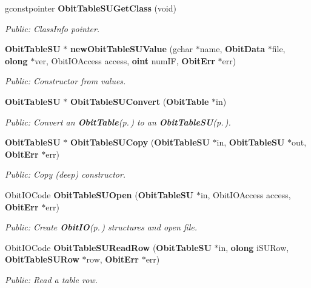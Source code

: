 \begin{CompactItemize}
gconstpointer {\bf Obit\-Table\-SUGet\-Class} (void)
\begin{CompactList}\small\item\em Public: Class\-Info pointer. \item\end{CompactList}\item 
{\bf Obit\-Table\-SU} $\ast$ {\bf new\-Obit\-Table\-SUValue} (gchar $\ast$name, {\bf Obit\-Data} $\ast$file, {\bf olong} $\ast$ver, Obit\-IOAccess access, {\bf oint} num\-IF, {\bf Obit\-Err} $\ast$err)
\begin{CompactList}\small\item\em Public: Constructor from values. \item\end{CompactList}\item 
{\bf Obit\-Table\-SU} $\ast$ {\bf Obit\-Table\-SUConvert} ({\bf Obit\-Table} $\ast$in)
\begin{CompactList}\small\item\em Public: Convert an {\bf Obit\-Table}{\rm (p.\,\pageref{structObitTable})} to an {\bf Obit\-Table\-SU}{\rm (p.\,\pageref{structObitTableSU})}. \item\end{CompactList}\item 
{\bf Obit\-Table\-SU} $\ast$ {\bf Obit\-Table\-SUCopy} ({\bf Obit\-Table\-SU} $\ast$in, {\bf Obit\-Table\-SU} $\ast$out, {\bf Obit\-Err} $\ast$err)
\begin{CompactList}\small\item\em Public: Copy (deep) constructor. \item\end{CompactList}\item 
Obit\-IOCode {\bf Obit\-Table\-SUOpen} ({\bf Obit\-Table\-SU} $\ast$in, Obit\-IOAccess access, {\bf Obit\-Err} $\ast$err)
\begin{CompactList}\small\item\em Public: Create {\bf Obit\-IO}{\rm (p.\,\pageref{structObitIO})} structures and open file. \item\end{CompactList}\item 
Obit\-IOCode {\bf Obit\-Table\-SURead\-Row} ({\bf Obit\-Table\-SU} $\ast$in, {\bf olong} i\-SURow, {\bf Obit\-Table\-SURow} $\ast$row, {\bf Obit\-Err} $\ast$err)
\begin{CompactList}\small\item\em Public: Read a table row. \item\end{CompactList}\item 

\end{CompactItemize}
